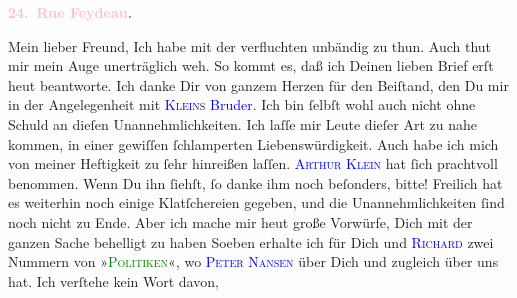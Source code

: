            \pstart
           \begin{otherlanguage}{french}\textcolor{gray}{\textbf{\textbf{\textcolor{pink}{24. Rue Feydeau}{}\ledrightnote{\textcolor{pink}{rue Feydeau}}.}}}\end{otherlanguage}\pend
           \pstart{}Mein lieber Freund,\pend\pstart
           Ich habe mit der verfluchten \label{K_L02805-1v}\label{K_L02805-1h} unbändig zu thun. Auch \strikeout{\textcolor{gray}{er}} thut mir mein Auge \strikeout{\textcolor{gray}{f}} unerträglich weh. So kommt es, daß ich Deinen lieben Brief erſt heut beantworte.\pend
           \pstart
           Ich danke Dir von ganzem Herzen für den Beiſtand, den Du mir in der Angelegenheit mit
                  \textsc{\textcolor{blue}{Klein}{}\ledrightnote{\textcolor{blue}{Arthur Klein}}s}{ }\textcolor{blue}{Bruder}{}\label{K_L02805-v}\label{K_L02805-h}. Ich bin ſelbſt
               wohl auch nicht ohne Schuld an dieſen Unannehmlichkeiten. Ich laſſe mir Leute dieſer
               Art zu nahe kommen, in einer gewiſſen ſchlamperten Liebenswürdigkeit. Auch habe ich
               mich von meiner Heftigkeit zu ſehr hinreißen laſſen. \textsc{\textcolor{blue}{Arthur Klein}{}\ledrightnote{\textcolor{blue}{Arthur Klein}}} hat ſich prachtvoll benommen. {\pb}Wenn Du ihn
               ſiehſt, ſo danke ihm noch beſonders, bitte! Freilich hat es weiterhin noch einige
               Klatſchereien gegeben, und die Unannehmlichkeiten ſind noch nicht zu Ende.  Aber ich mache mir heut große Vorwürfe, Dich
               mit der ganzen Sache behelligt zu haben{\dotsfive}\pend
           \pstart
           Soeben erhalte ich für  Dich und \textsc{\textcolor{blue}{Richard}{}\ledrightnote{\textcolor{blue}{Richard Beer-Hofmann}}} zwei Nummern von »\textsc{\textcolor{green}{Politiken}{}\ledrightnote{\textcolor{green}{Politiken}}}«, wo \textsc{\textcolor{blue}{Peter Nansen}{}\ledrightnote{\textcolor{blue}{Peter Nansen}}} über Dich und zugleich über uns \label{K_L02805-3v}\label{K_L02805-3h} hat. Ich verſtehe kein Wort davon,
